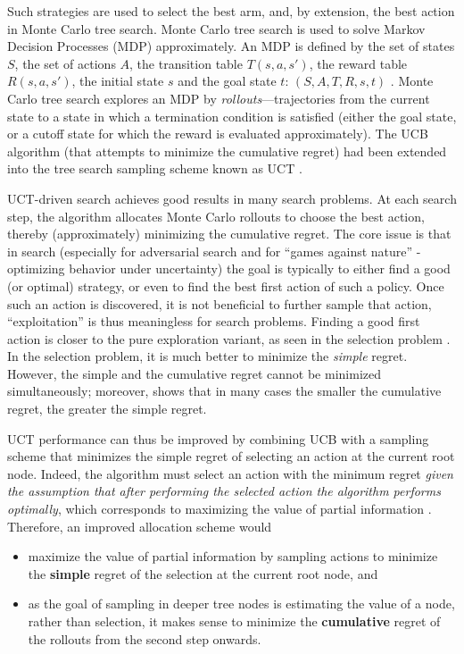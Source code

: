 \documentclass{article}
\begin{document}
Such strategies are used to select the best arm, and, by extension,
the best action in Monte Carlo tree search. Monte Carlo tree search is
used to solve Markov Decision Processes (MDP) approximately. An MDP is
defined by the set of states $S$, the set of actions $A$, the
transition table $T(s, a, s')$, the reward table $R(s, a, s')$, the
initial state $s$ and the goal state $t$: $(S, A, T, R, s, t)$
\cite{Russell.aima}.  Monte Carlo tree search explores an MDP by
\emph{rollouts}---trajectories from the current state to a state in
which a termination condition is satisfied (either the goal state, or
a cutoff state for which the reward is evaluated
approximately). The UCB algorithm (that attempts to minimize the cumulative regret)
\cite{Auer.ucb} had been extended into the tree search sampling scheme
known as UCT \cite{Kocsis.uct}.

UCT-driven search achieves good results in many search problems. At each
search step, the algorithm allocates Monte Carlo rollouts to choose
the best action, thereby (approximately) minimizing the cumulative regret. 
The core issue is that in search (especially for adversarial search
and for ``games against nature'' - optimizing behavior under uncertainty) the goal is typically
to either find a good (or optimal) strategy, or even to find the best first
action of such a policy. Once such an action is discovered, it is not beneficial
to further sample that action, ``exploitation'' is thus meaningless for
search problems. Finding a good first action is closer to the pure exploration
variant, as seen in the selection problem \cite{Bubeck.pure,TolpinShimony.blinkered}. In the selection
problem, it is much better to minimize the {\em simple} regret.
However, the simple and the cumulative regret cannot be minimized simultaneously;
moreover, \cite{Bubeck.pure} shows that in many cases the smaller the
cumulative regret, the greater the simple regret.

UCT performance can thus be improved by combining UCB with a sampling
scheme that minimizes the simple regret of selecting an action at the
current root node. Indeed, the algorithm must select an action with
the minimum regret \emph{given the assumption that after performing the selected action
the algorithm performs optimally}, which corresponds to maximizing the
value of partial information \cite{Russell.aima}. Therefore, an
improved allocation scheme would
\begin{itemize}
\item maximize the value of partial
information by sampling actions to
minimize the \textbf{simple} regret
of the selection at the current root node, and
\item as the goal of sampling in deeper tree nodes is estimating the value of
a node, rather than selection, it makes sense to
minimize the \textbf{cumulative} regret of the rollouts from the second
step onwards. 
\end{itemize}
\end{document}

